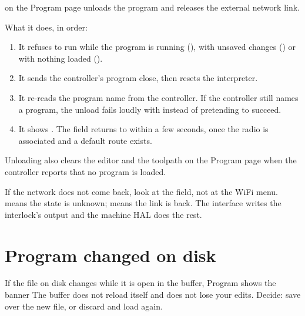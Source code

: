  on the Program page unloads the program and releases the external
network link.

What it does, in order:

\begin{enumerate}
  \item It refuses to run while the program is running (),
        with unsaved changes () or with nothing
        loaded ().
  \item It sends the controller's program close, then resets the interpreter.
  \item It re-reads the program name from the controller. If the controller still names a
        program, the unload fails loudly with  instead of pretending to succeed.
  \item It shows . The  field returns to
         within a few seconds, once the radio is associated and a default route
        exists.
\end{enumerate}

Unloading also clears the editor and the toolpath on the Program page when the controller
reports that no program is loaded.

\begin{tipbox}
  If the network does not come back, look at the  field, not at the WiFi menu.
   means the state is unknown;  means the link is back. The interface
  writes the interlock's  output and the machine HAL does the rest.
\end{tipbox}

\section{Program changed on disk}

If the file on disk changes while it is open in the buffer, Program shows the banner
 The buffer does not reload itself and does not lose your edits. Decide: save over
the new file, or discard and load again.

